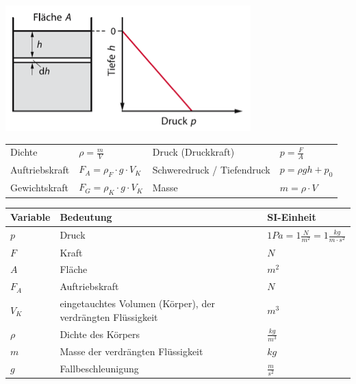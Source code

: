 \documentclass[
a4paper,
oneside,
landscape, 
8pt,
]{scrartcl}
\begin{document}
\begin{multicols*}{2}
\includegraphics[width=0.4\linewidth]{images/hydrodruck}

\begin{tabbing}
	\begin{tabu} to \linewidth {l X l X}
		\toprule
		Dichte & $\rho = \frac{m}{V}$ &
		Druck (Druckkraft) & $p = \frac{F}{A}$ \\
		Auftriebskraft & $F_A = \rho_F \cdot g \cdot V_K$ &
		Schweredruck / Tiefendruck & $p = \rho g h + p_0$ \\
		Gewichtskraft & $F_G = \rho_K \cdot g \cdot V_K $ &
		Masse & $m = \rho \cdot V$ \\
	\end{tabu}
\end{tabbing}

\begin{tabbing}
	\begin{tabu} to \linewidth {l X l}
		Variable & Bedeutung & SI-Einheit \\
		\midrule
		$p$ & Druck & $1 Pa = 1\frac{N}{m^2} = 1 \frac{kg}{m\cdot s^2}$ \\ 
		$F$ & Kraft & $N$ \\
		$A$ & Fläche & $m^2$ \\
		$F_A$ & Auftriebskraft & $N$ \\
		$V_K$ & eingetauchtes Volumen (Körper), der verdrängten Flüssigkeit & $m^3$ \\
		$\rho$ & Dichte des Körpers & $\frac{kg}{m^3}$ \\
		$m$ & Masse der verdrängten Flüssigkeit & $kg$ \\
		$g$ & Fallbeschleunigung & $\frac{m}{s^2}$\\
		\bottomrule
	\end{tabu}
\end{tabbing}


\end{multicols*}
\end{document}
